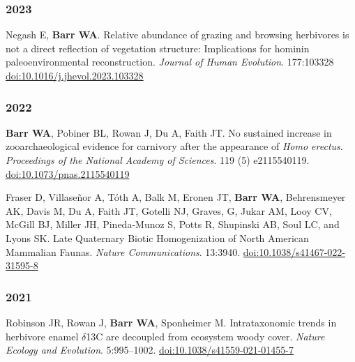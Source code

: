 \begin{etaremune}



\subsubsection*{2023}

\item Negash E, {\bfseries Barr WA}. Relative abundance of grazing and browsing herbivores is not a direct reflection of vegetation structure: Implications for hominin paleoenvironmental reconstruction. \emph{Journal of Human Evolution}. 177:103328 \href{https://doi.org/10.1016/j.jhevol.2023.103328}{doi:10.1016/j.jhevol.2023.103328}

\subsubsection*{2022}


\item {\bfseries Barr WA}, Pobiner BL, Rowan J, Du A, Faith JT.  No sustained increase in zooarchaeological evidence for carnivory after the appearance of \emph{Homo erectus}. \emph{Proceedings of the National Academy of Sciences}. 119 (5) e2115540119. \href{https://doi.org/10.1073/pnas.2115540119}{doi:10.1073/pnas.2115540119}

\item Fraser D, Villaseñor A, Tóth A, Balk M, Eronen JT, {\bfseries Barr WA}, Behrensmeyer AK, Davis M, Du A, Faith JT, Gotelli NJ, Graves, G, Jukar AM, Looy CV, McGill BJ, Miller JH, Pineda-Munoz S, Potts R,  Shupinski AB, Soul LC, and Lyons SK. Late Quaternary Biotic Homogenization of North American Mammalian Faunas. \emph{Nature Communications}. 13:3940. \href{https://doi.org/10.1038/s41467-022-31595-8}{doi:10.1038/s41467-022-31595-8}


\subsubsection*{2021}


\item Robinson JR, Rowan J,  {\bfseries Barr WA}, Sponheimer M. Intrataxonomic trends in herbivore enamel $\delta$13C are decoupled from ecosystem woody cover.  \emph{Nature Ecology and Evolution}. 5:995–1002. \href{https://dx.doi.org/10.1038/s41559-021-01455-7}{doi:10.1038/s41559-021-01455-7}


\end{etaremune}
